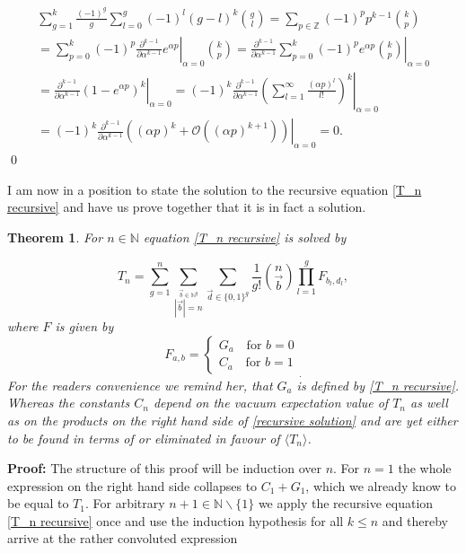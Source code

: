 \documentclass[b5paper,draft,openbib,12pt]{memoir}
\newtheorem{Thm}[Def]{Theorem}
\begin{document}
\begin{multline*}
\sum_{g=1}^k \frac{(-1)^g}{g} \sum_{l=0}^g (-1)^l (g-l)^k \binom{g}{l}
=\sum_{p\in\mathbb{Z}} (-1)^{p} p^{k-1}  \binom{k}{p}\\
=\sum_{p=0}^k (-1)^{p} \left. \frac{\partial^{k-1}}{\partial \alpha^{k-1}} e^{\alpha p}\right|_{\alpha=0}  \binom{k}{p}
=\left. \frac{\partial^{k-1}}{\partial \alpha^{k-1}}  \sum_{p=0}^k (-1)^{p} e^{\alpha p} \binom{k}{p}\right|_{\alpha=0} \\
=\left. \frac{\partial^{k-1}}{\partial \alpha^{k-1}}  \left( 1-e^{\alpha p}\right)^k \right|_{\alpha=0} 
=(-1)^k \left. \frac{\partial^{k-1}}{\partial \alpha^{k-1}} \left( \sum_{l=1}^\infty \frac{(\alpha p)^l}{l!} \right) ^k \right|_{\alpha=0} \\
=(-1)^k \left. \frac{\partial^{k-1}}{\partial \alpha^{k-1}} ((\alpha p)^k + \mathcal{O} ((\alpha p)^{k+1}) ) \right|_{\alpha=0} =0.
\end{multline*}
\qed




I am now in a position to state the solution to the recursive equation \eqref{T_n recursive}
and have us prove together that it is in fact a solution. 

\begin{Thm}
For \(n\in\mathbb{N}\) equation \eqref{T_n recursive} is solved by 

\begin{equation}\label{recursive solution}
T_n = \sum_{g=1}^n \sum_{\stackrel{\vec{b}\in\mathbb{N}^g}{|\vec{b}|= n}} \sum_{\vec{d}\in {\{0,1\}}^g} 
\frac{1}{g!} \binom{n}{\vec{b}} \prod_{l=1}^g F_{b_l,d_l},
\end{equation}
where \(F\) is given by
\begin{equation}\label{eq resursive weak solution}
F_{a,b} = \left\{ \begin{matrix}G_a \quad \text{for } b=0 \\ C_a \quad \text{for } b=1  \end{matrix} \right._. 
\end{equation}
For the readers convenience we remind her, that \(G_a\) is defined by \eqref{T_n recursive}. Whereas
the constants \(C_n\) depend on the vacuum expectation value of \(T_n\) as well as on the products
on the right hand side of \eqref{recursive solution} and are yet either to be found in terms of or 
eliminated in favour of \(\langle T_n \rangle \). 
\end{Thm}

\textbf{Proof:} The structure of this proof will be induction over \(n\). For \(n=1\) the whole expression
on the right hand side collapses to \(C_1 + G_1\), which we already know to be equal to \(T_1\). For
arbitrary \(n+1\in\mathbb{N}\backslash\{1\}\) we apply the recursive equation \eqref{T_n recursive}
once and use the induction hypothesis for all \(k\le n\) and thereby arrive at the rather convoluted 
expression
\end{document}
